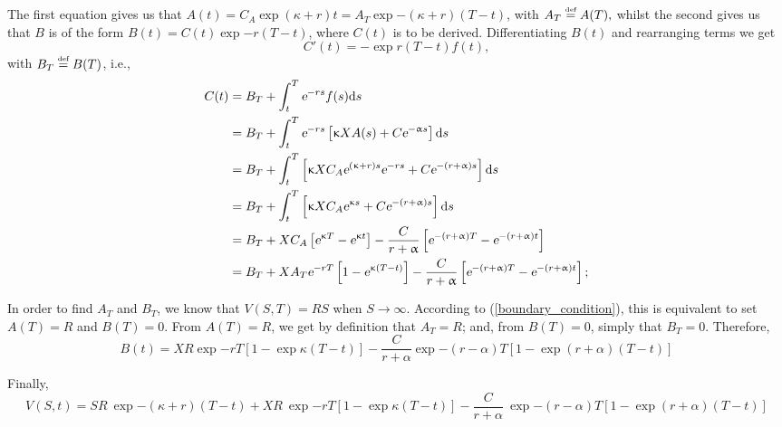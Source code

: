The first equation gives us that $A(t) = C_A \exp{(\kappa + r) t} = A_T \exp{-(\kappa + r)(T-t)}$, with 
$
A_T \overset{\text{\tiny def}}{=} A(T),
$ 
whilst the second gives us that $B$ is of the form $B(t) = C(t) \exp{-r (T-t)}$, where $C(t)$ is to be derived. Differentiating $B(t)$ and rearranging terms we get
\begin{equation}
	C'(t) = - \exp{r(T-t)}f(t), 
\end{equation}
with $  B_T \overset{\text{\tiny def}}{=} B(T)$, i.e.,
\begin{align*}
		C(t) 	&= B_T + \int_t^T \text{\sl e}^{-rs}f(s)\text{\rm d} s\\
				&= B_T + \int_t^T \text{\sl e}^{-rs}\left[\upkappa X A(s) + C\text{\sl e}^{-\upalpha s}\right]\text{\rm d} s\\
				&= B_T + \int_t^T \left[\upkappa XC_A \text{\sl e}^{(\upkappa + r) s} \text{\sl e}^{-rs} + C\text{\sl e}^{-(r+\upalpha)s}\right]\text{\rm d} s\\
				&= B_T + \int_t^T \left[\upkappa XC_A \text{\sl e}^{\upkappa s} + C\text{\sl e}^{-(r+\upalpha)s}\right]\text{\rm d} s\\
				&= B_T + {X C_A} \left[\text{\sl e}^{\upkappa T} - \text{\sl e}^{\upkappa t}\right] - \frac{C}{r+\upalpha}\left[\text{\sl e}^{-(r+\upalpha)T}-\text{\sl e}^{-(r+\upalpha)t}\right]\\
				&= B_T + {X A_T\text{\sl e}^{-rT}} \left[1 -  \text{\sl e}^{\upkappa (T-t)}\right]- \frac{C}{r+\upalpha}\left[\text{\sl e}^{-(r+\upalpha)T}-\text{\sl e}^{-(r+\upalpha)t}\right] ;
\end{align*}

In order to find $A_T$ and $B_T$, we know that $V(S, T) = RS$ when $S\to\infty$. According to (\ref{boundary_condition}), this is equivalent to set $A(T) = R$ and $B(T) = 0$. From $A(T) = R$, we get by definition that $A_T = R$; and, from $B(T) = 0$, simply that $B_T = 0$. Therefore,
\begin{equation}
	B(t) = {X R\exp{-rT}} \left[1 -  \exp{\kappa (T-t)}\right]- \frac{C}{r+\alpha}\exp{-(r-\alpha)T}\left[1-\exp{(r+\alpha)(T-t)}\right]
\end{equation}

Finally,
\begin{equation}\label{boundary_formula}
	V(S,t) = SR  \ \exp{-(\kappa + r)(T-t)} +  X R \ \exp{-rT} \left[1 -  \exp{\kappa (T-t)}\right]- \frac{C}{r+\alpha}\ \exp{-(r-\alpha)T}\left[1-\exp{(r+\alpha)(T-t)}\right]
\end{equation}

